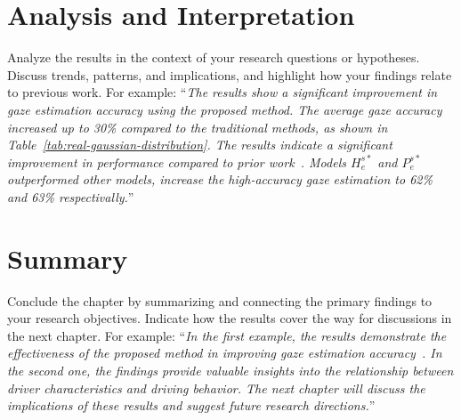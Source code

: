 \section{Analysis and Interpretation}\label{sec:analysis-interpretation}
Analyze the results in the context of your research questions or hypotheses. Discuss trends, patterns, and implications, and highlight how your findings relate to previous work. For example: ``\textit{The results show a significant improvement in gaze estimation accuracy using the proposed method. The average gaze accuracy increased up to 30\% compared to the traditional methods, as shown in Table~\ref{tab:real-gaussian-distribution}. The results indicate a significant improvement in performance compared to prior work~\cite{Narcizo2017}. Models $H_e^{s*}$ and $P_e^{s*}$ outperformed other models, increase the high-accuracy gaze estimation to 62\% and 63\% respectivally.}''

\section{Summary}\label{sec:results-summary}
Conclude the chapter by summarizing and connecting the primary findings to your research objectives. Indicate how the results cover the way for discussions in the next chapter. For example: ``\textit{In the first example, the results demonstrate the effectiveness of the proposed method in improving gaze estimation accuracy~\cite{Narcizo2021}. In the second one, the findings provide valuable insights into the relationship between driver characteristics and driving behavior. The next chapter will discuss the implications of these results and suggest future research directions.}''
